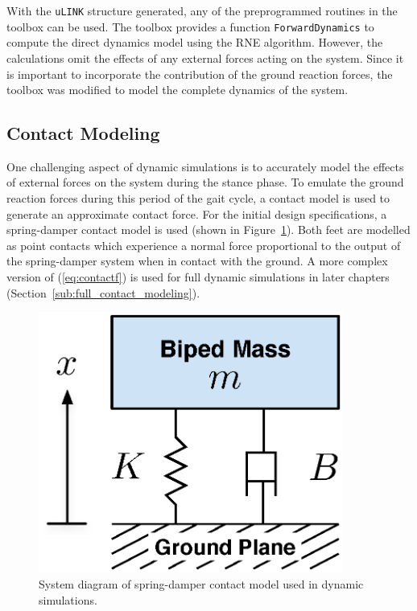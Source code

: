 With the \texttt{uLINK} structure generated, any of the preprogrammed routines in the toolbox can be used. The toolbox provides a function \texttt{ForwardDynamics} to compute the direct dynamics model using the RNE algorithm. However, the calculations omit the effects of any external forces acting on the system. Since it is important to incorporate the contribution of the ground reaction forces, the toolbox was modified to model the complete dynamics of the system. 

\subsection{Contact Modeling} %
\label{sub:initial_contact_modeling}

One challenging aspect of dynamic simulations is to accurately model the effects of external forces on the system during the stance phase. To emulate the ground reaction forces during this period of the gait cycle, a contact model is used to generate an approximate contact force. For the initial design specifications, a spring-damper contact model is used (shown in Figure~\ref{fig:springdamper}). Both feet are modelled as point contacts which experience a normal force proportional to the output of the spring-damper system when in contact with the ground. A more complex version of (\ref{eq:contactf}) is used for full dynamic simulations in later chapters (Section~\ref{sub:full_contact_modeling}).

\begin{figure}[!b]
	\begin{center}
    \includegraphics[width=100mm]{fig/design/springdamper.eps}
	\end{center}
  \caption{System diagram of spring-damper contact model used in dynamic simulations.}
  \label{fig:springdamper}
\end{figure}

